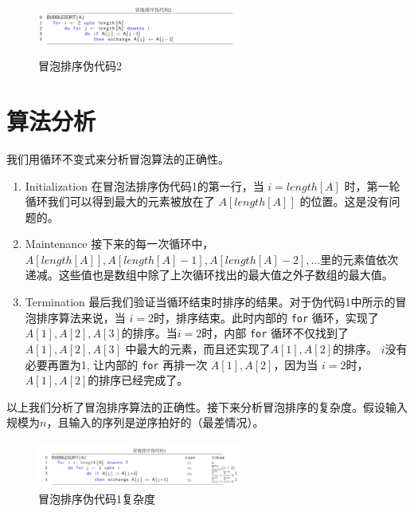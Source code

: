 \documentclass[10pt,a4paper,UTF8]{article}
\begin{document}
\begin{figure}[htbp]
\centering
\includegraphics[width=0.6\textwidth]{../../img/computer_algorithms/20170702bubbleSortPseudoCode2.png}
\caption{\label{fig:orgc70e733}
冒泡排序伪代码2}
\end{figure}

\section{算法分析}
\label{sec:org888e64d}



我们用循环不变式来分析冒泡算法的正确性。

\begin{enumerate}
\item Initialization 在冒泡法排序伪代码1的第一行，当 \(i=length[A]\)  时，第一轮循环我们可以得到最大的元素被放在了 \(A[length[A]]\)  的位置。这是没有问题的。
\item Maintenance 接下来的每一次循环中，\(A[length[A]],A[length[A]-1],A[length[A]-2],\ldots\)里的元素值依次递减。这些值也是数组中除了上次循环找出的最大值之外子数组的最大值。
\item Termination 最后我们验证当循环结束时排序的结果。对于伪代码1中所示的冒泡排序算法来说，当 \(i=2\)时，排序结束。此时内部的 \texttt{for} 循环，实现了 \(A[1],A[2],A[3]\)的排序。当\(i=2\)时，内部 \texttt{for} 循环不仅找到了\(A[1],A[2],A[3]\) 中最大的元素，而且还实现了\(A[1],A[2]\)的排序。 \(i\)没有必要再置为1, 让内部的 \texttt{for} 再排一次 \(A[1],A[2]\)，因为当 \(i=2\)时，\(A[1],A[2]\)的排序已经完成了。
\end{enumerate}

以上我们分析了冒泡排序算法的正确性。接下来分析冒泡排序的复杂度。假设输入规模为\(n\)，且输入的序列是逆序拍好的（最差情况）。

\begin{figure}[htbp]
\centering
\includegraphics[width=0.6\textwidth]{../../img/computer_algorithms/20170702bubbleSortPseudoCode1complexity.png}
\caption{\label{fig:orgeac0cb1}
冒泡排序伪代码1复杂度}
\end{figure}
\end{document}
